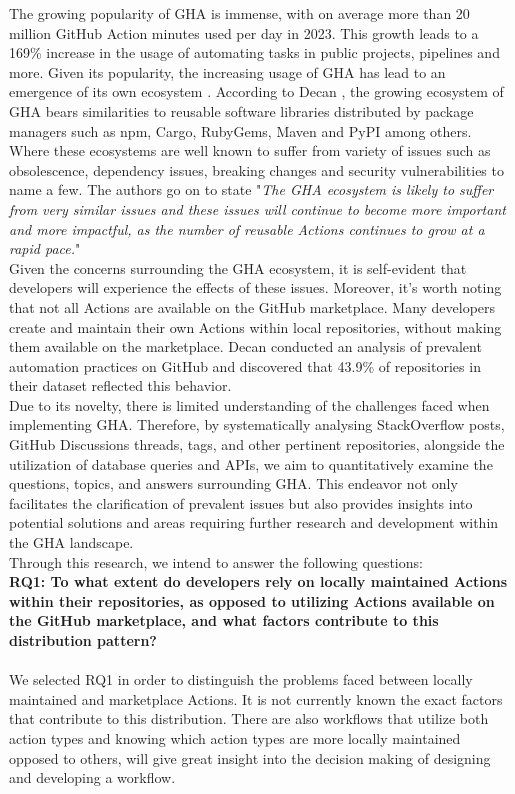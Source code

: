 \documentclass[conference]{IEEEtran}
\begin{document}
    The growing popularity of GHA is immense, with on average more than 20 million GitHub Action minutes used per day in 2023. This growth leads to a 169\% increase in the usage of automating tasks in public projects,  pipelines and more\cite{github2023octoverse}. Given its popularity,  the increasing usage of GHA has lead to an emergence of its own ecosystem \cite{decan2022use}.  According to Decan \cite{decan2022use}, the growing ecosystem of GHA bears similarities to reusable software libraries distributed by package managers such as npm, Cargo, RubyGems, Maven and PyPI among others. Where these ecosystems are well known to suffer from variety of issues such as obsolescence, dependency issues, breaking changes and security vulnerabilities to name a few\cite{decan2022use}. The authors go on to state "\textit{The GHA ecosystem is likely to suffer from very similar issues and these issues will continue to become more important and more impactful, as the number of reusable Actions continues to grow at a rapid pace.}"\\

    Given the concerns surrounding the GHA ecosystem, it is self-evident that developers will experience the effects of these issues.  Moreover, it's worth noting that not all Actions are available on the GitHub marketplace. Many developers create and maintain their own Actions within local repositories, without making them available on the marketplace. Decan \cite{decan2022use} conducted an analysis of prevalent automation practices on GitHub and discovered that 43.9\% of repositories in their dataset reflected this behavior.\\

    Due to its novelty, there is limited understanding of the challenges faced when implementing GHA.  
Therefore,  by systematically analysing StackOverflow posts, GitHub Discussions threads, tags, and other pertinent repositories, alongside the utilization of database queries and APIs, we aim to quantitatively examine the questions, topics, and answers surrounding GHA. This endeavor not only facilitates the clarification of prevalent issues but also provides insights into potential solutions and areas requiring further research and development within the GHA landscape.\\

Through this research, we intend to answer the following questions:
\\


     \textbf{RQ1: To what extent do developers rely on locally maintained Actions within their repositories, as opposed to utilizing Actions available on the GitHub marketplace, and what factors contribute to this distribution pattern?}
\\
\\
We selected RQ1 in order to distinguish the problems faced between locally maintained and marketplace Actions. It is not currently known the exact factors that contribute to this distribution. There are also workflows that utilize both action types and knowing which action types are more locally maintained opposed to others, will give great insight into the decision making of designing and developing a workflow. \\
\end{document}
